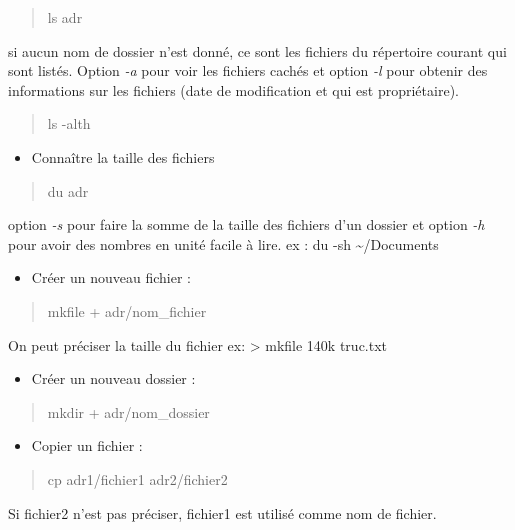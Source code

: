 \begin{quote}
ls adr
\end{quote}

si aucun nom de dossier n'est donné, ce sont les fichiers du répertoire
courant qui sont listés. Option \emph{-a} pour voir les fichiers cachés
et option \emph{-l} pour obtenir des informations sur les fichiers (date
de modification et qui est propriétaire).

\begin{quote}
ls -alth
\end{quote}

\begin{itemize}
\tightlist
\item
  Connaître la taille des fichiers
\end{itemize}

\begin{quote}
du adr
\end{quote}

option \emph{-s} pour faire la somme de la taille des fichiers d'un
dossier et option \emph{-h} pour avoir des nombres en unité facile à
lire. ex : du -sh \textasciitilde{}/Documents

\begin{itemize}
\tightlist
\item
  Créer un nouveau fichier :
\end{itemize}

\begin{quote}
mkfile + adr/nom\_fichier
\end{quote}

On peut préciser la taille du fichier ex: \textgreater{} mkfile 140k
truc.txt

\begin{itemize}
\tightlist
\item
  Créer un nouveau dossier :
\end{itemize}

\begin{quote}
mkdir + adr/nom\_dossier
\end{quote}

\begin{itemize}
\tightlist
\item
  Copier un fichier :
\end{itemize}

\begin{quote}
cp adr1/fichier1 adr2/fichier2
\end{quote}

Si fichier2 n'est pas préciser, fichier1 est utilisé comme nom de
fichier.

